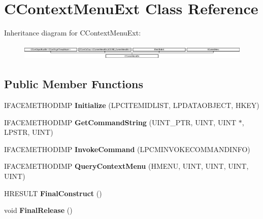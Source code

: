 \hypertarget{class_c_context_menu_ext}{\section{C\-Context\-Menu\-Ext Class Reference}
\label{class_c_context_menu_ext}
}
Inheritance diagram for C\-Context\-Menu\-Ext\-:\begin{figure}[H]
\begin{center}
\leavevmode
\includegraphics[height=0.752688cm]{class_c_context_menu_ext}
\end{center}
\end{figure}
\subsection*{Public Member Functions}
\begin{DoxyCompactItemize}
\item 
\hypertarget{class_c_context_menu_ext_a834d055436f04581734e2a1501814d12}{I\-F\-A\-C\-E\-M\-E\-T\-H\-O\-D\-I\-M\-P {\bfseries Initialize} (L\-P\-C\-I\-T\-E\-M\-I\-D\-L\-I\-S\-T, L\-P\-D\-A\-T\-A\-O\-B\-J\-E\-C\-T, H\-K\-E\-Y)}\label{class_c_context_menu_ext_a834d055436f04581734e2a1501814d12}

\item 
\hypertarget{class_c_context_menu_ext_ac940296ea0f5842cd7e574be8c0d3199}{I\-F\-A\-C\-E\-M\-E\-T\-H\-O\-D\-I\-M\-P {\bfseries Get\-Command\-String} (U\-I\-N\-T\-\_\-\-P\-T\-R, U\-I\-N\-T, U\-I\-N\-T $\ast$, L\-P\-S\-T\-R, U\-I\-N\-T)}\label{class_c_context_menu_ext_ac940296ea0f5842cd7e574be8c0d3199}

\item 
\hypertarget{class_c_context_menu_ext_a1472865e977ed83344909a9fdff0bdfd}{I\-F\-A\-C\-E\-M\-E\-T\-H\-O\-D\-I\-M\-P {\bfseries Invoke\-Command} (L\-P\-C\-M\-I\-N\-V\-O\-K\-E\-C\-O\-M\-M\-A\-N\-D\-I\-N\-F\-O)}\label{class_c_context_menu_ext_a1472865e977ed83344909a9fdff0bdfd}

\item 
\hypertarget{class_c_context_menu_ext_a97631382ae0da3bd54e69e3051fc56d4}{I\-F\-A\-C\-E\-M\-E\-T\-H\-O\-D\-I\-M\-P {\bfseries Query\-Context\-Menu} (H\-M\-E\-N\-U, U\-I\-N\-T, U\-I\-N\-T, U\-I\-N\-T, U\-I\-N\-T)}\label{class_c_context_menu_ext_a97631382ae0da3bd54e69e3051fc56d4}

\item 
\hypertarget{class_c_context_menu_ext_a55059b534e0eaccb7e4ae04c4a4a881d}{H\-R\-E\-S\-U\-L\-T {\bfseries Final\-Construct} ()}\label{class_c_context_menu_ext_a55059b534e0eaccb7e4ae04c4a4a881d}

\item 
\hypertarget{class_c_context_menu_ext_a78c7895d712ffe0acfe9862e7db33ef1}{void {\bfseries Final\-Release} ()}\label{class_c_context_menu_ext_a78c7895d712ffe0acfe9862e7db33ef1}

\end{DoxyCompactItemize}
